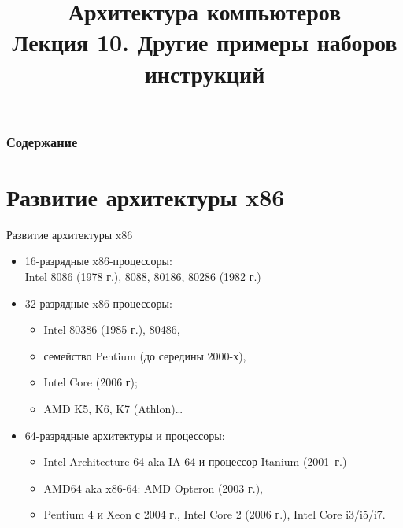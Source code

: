 \newcommand{\h}{%
handout,%
}



\title[Другие примеры наборов инструкций]{Архитектура компьютеров\texorpdfstring{\\}{ }Лекция 10. Другие примеры наборов инструкций}



\begin{frame}
\titlepage
\end{frame}

\begin{frame}
\frametitle{Содержание}
\tableofcontents
\end{frame}

\section{Развитие архитектуры x86}

\begin{frame}{Развитие архитектуры x86}

\pause
\begin{itemize}[<+->]\itemsep=.3cm
      \item 16-разрядные x86-процессоры:\\ Intel 8086 (1978 г.), 8088, 80186, 80286 (1982 г.)

      \item 32-разрядные x86-процессоры:
      \begin{itemize}
        \item Intel 80386 (1985 г.), 80486,
        \item семейство Pentium  (до середины 2000-х),
        \item Intel Core (2006 г);
        \item AMD K5, K6, K7 (Athlon)…
      \end{itemize}

      \item 64-разрядные архитектуры и процессоры:
      \begin{itemize}
          \item Intel Architecture 64 aka IA-64 и процессор Itanium (2001~г.)
          \item AMD64 aka x86-64: AMD Opteron (2003 г.),
          \item Pentium 4 и Xeon с 2004 г., Intel Core 2 (2006 г.), Intel Core i3/i5/i7.
      \end{itemize}
\end{itemize}

\end{frame}

